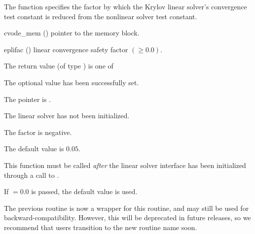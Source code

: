 {
  The function  specifies the factor by
  which the Krylov linear solver's convergence test constant is
  reduced from the nonlinear solver test constant.
}
{
  \begin{args}
  \item[cvode\_mem] ()
    pointer to the {\cvode} memory block.
  \item[eplifac] () linear convergence safety factor $(
    \geq 0.0)$.

  \end{args}
}
{
  The return value  (of type ) is one of
  \begin{args}
  \item[\Id{CVLS\_SUCCESS}]
    The optional value has been successfully set.
  \item[\Id{CVLS\_MEM\_NULL}]
    The  pointer is .
  \item[\Id{CVLS\_LMEM\_NULL}]
    The {\cvls} linear solver has not been initialized.
  \item[\Id{CVLS\_ILL\_INPUT}]
    The factor  is negative.
  \end{args}
}
{
  The default value is $0.05$.

  This function must be called \emph{after} the {\cvls} linear solver
  interface has been initialized through a call to
  .

  If $ = 0.0$ is passed, the default value is used.

  The previous routine  is now a wrapper for this
  routine, and may still be used for backward-compatibility.  However,
  this will be deprecated in future releases, so we recommend that
  users transition to the new routine name soon.
}



